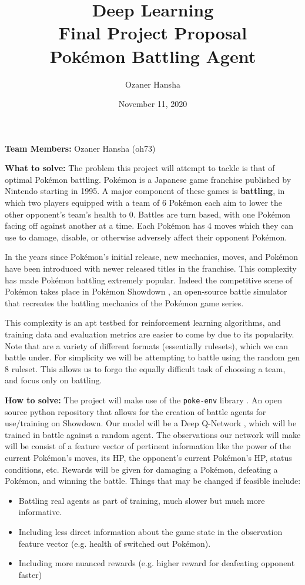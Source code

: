 \documentclass{article}
\begin{document}
\title{Deep Learning\\ Final Project Proposal\\ Pokémon Battling Agent}
\author{Ozaner Hansha}
\date{November 11, 2020}
\maketitle

\noindent\textbf{Team Members:} Ozaner Hansha (oh73)
\bigskip

\noindent\textbf{What to solve:} The problem this project will attempt to tackle is that of optimal Pokémon battling. Pokémon is a Japanese game franchise published by Nintendo starting in 1995. A major component of these games is \textbf{battling}, in which two players equipped with a team of 6 Pokémon each aim to lower the other opponent's team's health to 0. Battles are turn based, with one Pokémon facing off against another at a time. Each Pokémon has 4 moves which they can use to damage, disable, or otherwise adversely affect their opponent Pokémon. \cite{bulbapedia}

In the years since Pokémon's initial release, new mechanics, moves, and Pokémon have been introduced with newer released titles in the franchise. This complexity has made Pokémon battling extremely popular. Indeed the competitive scene of Pokémon takes place in Pokémon Showdown \cite{showdown}, an open-source battle simulator that recreates the battling mechanics of the Pokémon game series.

This complexity is an apt testbed for reinforcement learning algorithms, and training data and evaluation metrics are easier to come by due to its popularity. Note that are a variety of different formats (essentially rulesets), which we can battle under. For simplicity we will be attempting to battle using the random gen 8 ruleset. This allows us to forgo the equally difficult task of choosing a team, and focus only on battling.
\bigskip

\noindent\textbf{How to solve:} The project will make use of the \texttt{poke-env} library \cite{pokeenv}. An open source python repository that allows for the creation of battle agents for use/training on Showdown. Our model will be a Deep Q-Network \cite{dqn}, which will be trained in battle against a random agent. The observations our network will make will be consist of a feature vector of pertinent information like the power of the current Pokémon's moves, its HP, the opponent's current Pokémon's HP, status conditions, etc. Rewards will be given for damaging a Pokémon, defeating a Pokémon, and winning the battle. Things that may be changed if feasible include:
\begin{itemize}
	\item Battling real agents as part of training, much slower but much more informative. 
	\item Including less direct information about the game state in the observation feature vector (e.g. health of switched out Pokémon).
	\item Including more nuanced rewards (e.g. higher reward for deafeating opponent faster)
\end{itemize}
\end{document}
